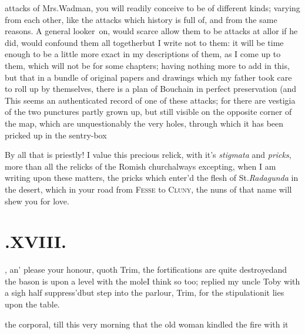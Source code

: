 \documentclass{article}
\begin{document}
 attacks of Mrs.\@ Wadman,
you will readily conceive to be of different kinds; varying from
each other, like the attacks which history is full of, and from the
same reasons. A general looker~on, would scarce allow them to be
attacks at all\tsh or if he did, would confound them all
together\tsh but I write not to them: it will be time
enough to be a little more exact in my descriptions of them, as I
come up to them, which will not be for some chapters; having
nothing more to add in this, but that in a bundle of original
papers and drawings which my father took care to roll up by
themselves, there is a plan of
Bouchain in perfect preservation (and
This seems an
authenticated record of one of these attacks; for there are
vestigia of the two punctures partly grown up, but still visible on
the opposite corner of the map, which are unquestionably the very
holes, through which it has been pricked up in the
sentry-box\tsh

By all that is priestly! I value this precious relick, with it’s
\textit{stigmata} and
\textit{pricks}, more than all the relicks of the
Romish church\tsh always excepting, when I am
writing upon these matters, the pricks which enter’d the flesh of
St.\@ \textit{Radagunda} in the desert, which in your road from
\textsc{Fesse} to \textsc{Cluny}, the nuns of that name
will shew you for love.

\medskip

\section{.\enspace XVIII.}

, an’ please your
honour, quoth Trim, the fortifications are quite
destroyed\tsh and the bason is upon a level with the
mole\tsh I think so too; replied my uncle Toby with
a sigh half suppress’d\tsh but step into the
parlour, Trim, for the stipulation\tsh it lies upon
the table.

\noindent
{}
the corporal, till
this very morning that the old woman kindled the fire with
it\tsk
\end{document}
